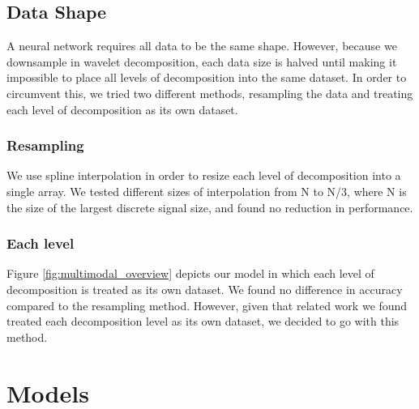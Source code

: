 \documentclass{turabian-thesis}
\begin{document}










\section{Data Shape}

A neural network requires all data to be the same shape. However, because we downsample in wavelet decomposition, each data size is halved until making it impossible to place all levels of decomposition into the same dataset. In order to circumvent this, we tried two different methods, resampling the data and treating each level of decomposition as its own dataset.


\subsection{Resampling}

We use spline interpolation in order to resize each level of decomposition into a single array. We tested different sizes of interpolation from N to N/3, where N is the size of the largest discrete signal size, and found no reduction in performance.

\subsection{Each level}
Figure \ref{fig:multimodal_overview} depicts our model in which each level of decomposition is treated as its own dataset. We found no difference in accuracy compared to the resampling method. However, given that related work we found treated each decomposition level as its own dataset, we decided to go with this method. 




\chapter{Models}
\label{chap:models}
\end{document}
